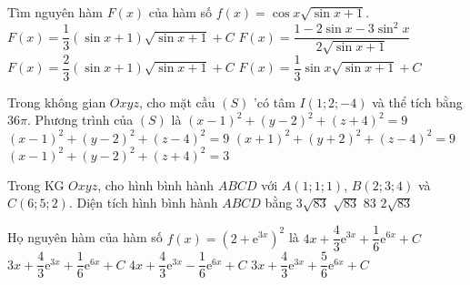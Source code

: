 \begin{ex}%
Tìm nguyên hàm $F(x)$ của hàm số $f(x)=\cos x\sqrt{\sin x+1}$.
\choice
{$F(x)=\dfrac{1}{3}(\sin x+1)\sqrt{\sin x+1}+C$}
{$F(x)=\dfrac{1-2\sin x-3\sin^2 x}{2\sqrt{\sin x+1}}$}
{\True $F(x)=\dfrac{2}{3}(\sin x+1)\sqrt{\sin x+1}+C$}
{$F(x)=\dfrac{1}{3}\sin x\sqrt{\sin x+1}+C$}
\end{ex}

\begin{ex}%
Trong không gian $O x y z$, cho mặt cầu $(S)$ 'có tâm $I(1 ; 2 ;-4)$ và thể tích bằng $36 \pi$. Phương trình của $(S)$ là
\choice
{\True $(x-1)^{2}+(y-2)^{2}+(z+4)^{2}=9$}
{$(x-1)^{2}+(y-2)^{2}+(z-4)^{2}=9$}
{$(x+1)^{2}+(y+2)^{2}+(z-4)^{2}=9$}
{$(x-1)^{2}+(y-2)^{2}+(z+4)^{2}=3$}
\end{ex}

\begin{ex}%
Trong KG $Oxyz$, cho hình bình hành  $ABCD$ với  $A(1;1;1)$, $B(2;3;4)$ và $C(6;5;2)$. Diện tích hình bình hành $ABCD$  bằng \choice
{$3\sqrt{83} $}
{$\sqrt{83} $}
{$ 83 $}
{\True $2\sqrt{83}$}
\end{ex}

\begin{ex}%
Họ nguyên hàm của hàm số $f(x)=(2+\mathrm{e}^{3x})^2$ là
\choice
{\True $4 x+\dfrac{4}{3} \mathrm{e}^{3x}+\dfrac{1}{6} \mathrm{e}^{6 x}+C$}
{$3x+\dfrac{4}{3} \mathrm{e}^{3x}+\dfrac{1}{6} \mathrm{e}^{6 x}+C$}
{$4 x+\dfrac{4}{3} \mathrm{e}^{3x}-\dfrac{1}{6} \mathrm{e}^{6 x}+C$}
{$3x+\dfrac{4}{3} \mathrm{e}^{3x}+\dfrac{5}{6} \mathrm{e}^{6 x}+C$}
\end{ex}


